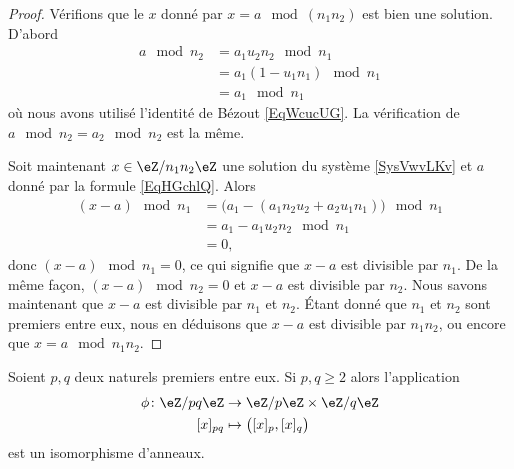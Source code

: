 \begin{proof}
    Vérifions que le \( x\) donné par \(x=a\mod(n_1n_2)\) est bien une solution. D'abord
    \begin{subequations}
        \begin{align}
            a\mod n_2&=a_1u_2n_2\mod n_1\\
            &=a_1(1-u_1n_1)\mod n_1\\
            &=a_1\mod n_1
        \end{align}
    \end{subequations}
    où nous avons utilisé l'identité de Bézout \eqref{EqWcucUG}. La vérification de \( a\mod n_2=a_2\mod n_2\) est la même.

    Soit maintenant \( x\in \eZ/n_1n_2\eZ\) une solution du système \eqref{SysVwvLKv} et \( a\) donné par la formule \eqref{EqHGchlQ}. Alors
    \begin{subequations}
        \begin{align}
            (x-a)\mod n_1&=\Big( a_1-(a_1n_2u_2+a_2u_1n_1) \Big)\mod n_1\\
            &=a_1-a_1u_2n_2\mod n_1\\
            &=0,
        \end{align}
    \end{subequations}
    donc \( (x-a)\mod n_1=0\), ce qui signifie que \( x-a\) est divisible par \( n_1\). De la même façon, \( (x-a)\mod n_2=0\) et \( x-a\) est divisible par \( n_2\). Nous savons maintenant que \( x-a\) est divisible par \( n_1\) et \( n_2\). Étant donné que \( n_1\) et \( n_2\) sont premiers entre eux, nous en déduisons que \( x-a\) est divisible par \( n_1n_2\), ou encore que \( x=a\mod n_1n_2\).
\end{proof}

\begin{theorem}
    Soient \( p,q\) deux naturels premiers entre eux. Si \( p,q\geq 2\) alors l'application
    \begin{equation}
        \begin{aligned}
            \phi\colon \eZ/pq\eZ&\to \eZ/p\eZ\times \eZ/q\eZ \\
            [x]_{pq}&\mapsto \big( [x]_p,[x]_q \big) 
        \end{aligned}
    \end{equation}
    est un isomorphisme d'anneaux.
\end{theorem}

